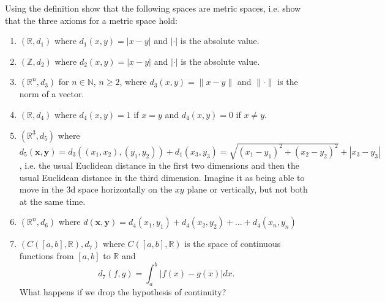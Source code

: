 \documentclass[11pt]{article}%
\newcommand{\R}{\mathbb{R}}
\newcommand{\N}{\mathbb{N}}
\begin{document}
\begin{Exercise} [title=**$\dagger$]
	Using the definition show that the following spaces are metric spaces, i.e. show that the three axioms for a metric space hold:
	\begin{enumerate}[label={\alph*)}]
		\item $(\R,d_1)$ where $d_1(x,y)=|x-y|$ and $|\cdot|$ is the absolute value.
		\item $(\mathbb Z,d_2)$ where $d_2(x,y)=|x-y|$ and $|\cdot|$ is the absolute value.
		\item $(\R^n,d_3)$ for $n\in\N$, $n\geq 2$, where $d_3(x,y)=\lVert x-y\rVert$ and $\lVert \cdot\rVert$ is the norm of a vector.
		\item $(\R,d_4)$ where $d_4(x,y)=1$ if $x=y$ and $d_4(x,y)=0$ if $x\neq y$.
		\item $(\R^3, d_5)$ where $d_5(\textbf{x},\textbf{y}) = d_3((x_1,x_2),(y_1,y_2))+d_1(x_3,y_3)=  \sqrt{(x_1-y_1)^2+(x_2-y_2)^2}+|x_3-y_3|$, i.e. the usual Euclidean distance in the first two dimensions and then the usual Euclidean distance in the third dimension. Imagine it as being able to move in the 3d space horizontally on the $xy$ plane or vertically, but not both at the same time.
		\item $(\R^n, d_6)$ where $d(\textbf{x},\textbf{y})=d_4(x_1,y_1)+d_4(x_2,y_2)+\dots+d_4(x_n,y_n)$
		\item $(C([a,b], \R), d_7)$ where $C([a,b], \R)$ is the space of continuous functions from $[a,b]$ to $\R$ and \[d_7(f,g) = \int_a^b |f(x)-g(x)|dx.\]
		What happens if we drop the hypothesis of continuity?
		
	\end{enumerate}
\end{Exercise}
\end{document}
